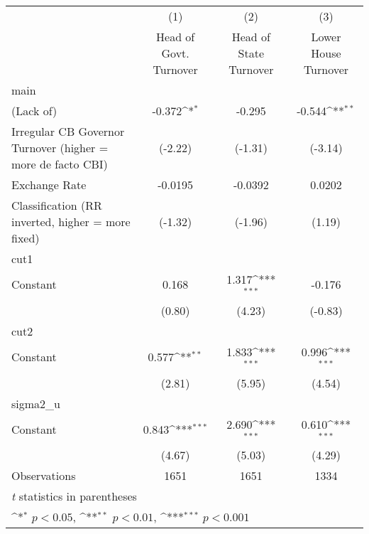 {
\def\sym#1{\ifmmode^{#1}\else\(^{#1}\)\fi}
\begin{tabular}{l*{3}{c}}
\toprule
                &\multicolumn{1}{c}{(1)}&\multicolumn{1}{c}{(2)}&\multicolumn{1}{c}{(3)}\\
                &\multicolumn{1}{c}{Head of Govt. Turnover}&\multicolumn{1}{c}{Head of State Turnover}&\multicolumn{1}{c}{Lower House Turnover}\\
\midrule
main            &                  &                  &                  \\
(Lack of)       &   -0.372\sym{*}  &   -0.295         &   -0.544\sym{**} \\
Irregular CB Governor Turnover (higher = more de facto CBI)&  (-2.22)         &  (-1.31)         &  (-3.14)         \\
\addlinespace
Exchange Rate   &  -0.0195         &  -0.0392         &   0.0202         \\
Classification (RR inverted, higher = more fixed)&  (-1.32)         &  (-1.96)         &   (1.19)         \\
\midrule
cut1            &                  &                  &                  \\
Constant        &    0.168         &    1.317\sym{***}&   -0.176         \\
                &   (0.80)         &   (4.23)         &  (-0.83)         \\
\midrule
cut2            &                  &                  &                  \\
Constant        &    0.577\sym{**} &    1.833\sym{***}&    0.996\sym{***}\\
                &   (2.81)         &   (5.95)         &   (4.54)         \\
\midrule
sigma2\_u        &                  &                  &                  \\
Constant        &    0.843\sym{***}&    2.690\sym{***}&    0.610\sym{***}\\
                &   (4.67)         &   (5.03)         &   (4.29)         \\
\midrule
Observations    &     1651         &     1651         &     1334         \\
\bottomrule
\multicolumn{4}{l}{\footnotesize \textit{t} statistics in parentheses}\\
\multicolumn{4}{l}{\footnotesize \sym{*} \(p<0.05\), \sym{**} \(p<0.01\), \sym{***} \(p<0.001\)}\\
\end{tabular}
}
